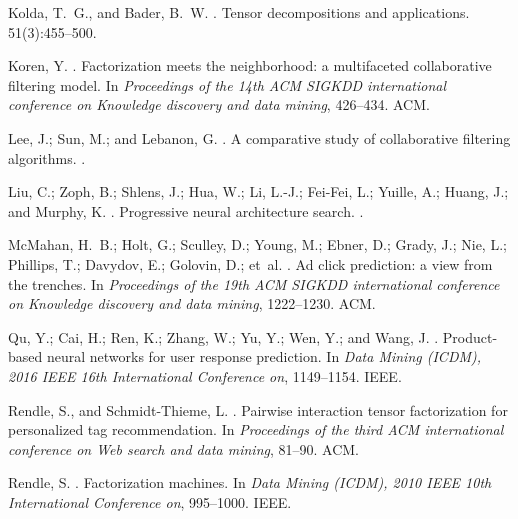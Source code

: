 \documentclass[letterpaper]{article} \usepackage{aaai19}  \usepackage{times}  \usepackage{helvet}  \usepackage{courier}  \usepackage{url}  \usepackage{graphicx}  \frenchspacing  \setlength{\pdfpagewidth}{8.5in}  \setlength{\pdfpageheight}{11in}  \usepackage{mathtools}
\begin{document}
\begin{thebibliography}{}
Kolda, T.~G., and Bader, B.~W.
.
\newblock Tensor decompositions and applications.
 51(3):455--500.

Koren, Y.
.
\newblock Factorization meets the neighborhood: a multifaceted collaborative
  filtering model.
\newblock In {\em Proceedings of the 14th ACM SIGKDD international conference
  on Knowledge discovery and data mining},  426--434.
\newblock ACM.

Lee, J.; Sun, M.; and Lebanon, G.
.
\newblock A comparative study of collaborative filtering algorithms.
.

Liu, C.; Zoph, B.; Shlens, J.; Hua, W.; Li, L.-J.; Fei-Fei, L.; Yuille, A.;
  Huang, J.; and Murphy, K.
.
\newblock Progressive neural architecture search.
.

McMahan, H.~B.; Holt, G.; Sculley, D.; Young, M.; Ebner, D.; Grady, J.; Nie,
  L.; Phillips, T.; Davydov, E.; Golovin, D.; et~al.
.
\newblock Ad click prediction: a view from the trenches.
\newblock In {\em Proceedings of the 19th ACM SIGKDD international conference
  on Knowledge discovery and data mining},  1222--1230.
\newblock ACM.

Qu, Y.; Cai, H.; Ren, K.; Zhang, W.; Yu, Y.; Wen, Y.; and Wang, J.
.
\newblock Product-based neural networks for user response prediction.
\newblock In {\em Data Mining (ICDM), 2016 IEEE 16th International Conference
  on},  1149--1154.
\newblock IEEE.

Rendle, S., and Schmidt-Thieme, L.
.
\newblock Pairwise interaction tensor factorization for personalized tag
  recommendation.
\newblock In {\em Proceedings of the third ACM international conference on Web
  search and data mining},  81--90.
\newblock ACM.

Rendle, S.
.
\newblock Factorization machines.
\newblock In {\em Data Mining (ICDM), 2010 IEEE 10th International Conference
  on},  995--1000.
\newblock IEEE.


\end{thebibliography}
\end{document}
